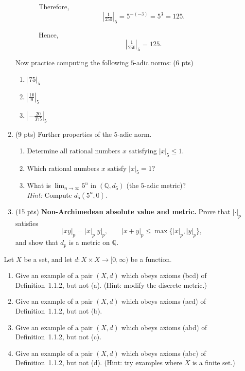 \begin{problem}
\begin{enumerate}
\begin{itemize}
\begin{enumerate}
Therefore,
\[
\left|\tfrac{1}{250}\right|_5 
= 5^{-(-3)} 
= 5^3 
= 125.
\]

Hence,
\[
\boxed{\;\;\left|\tfrac{1}{250}\right|_5 = 125.\;\;}
\]
\end{enumerate}
\end{itemize}

\medskip

Now practice computing the following $5$-adic norms:
 (6 pts) 
\begin{enumerate}
\item $|75|_5$
\item $\left|\tfrac{10}{9}\right|_5$
\item $\left|-\tfrac{20}{375}\right|_5$
\end{enumerate}

\medskip

\item[\textbf{(b)}]  (9 pts)  Further properties of the $5$-adic norm.
\begin{enumerate}
\item Determine all rational numbers $x$ satisfying $|x|_5\le 1$. 
\item Which rational numbers $x$ satisfy $|x|_5=1$?
\item What is $\lim_{n \to \infty} 5^n$ in $(\mathbb{Q}, d_5)$ (the $5$-adic metric)? \\
\emph{Hint:} Compute $d_5(5^n,0)$.
\end{enumerate}

\medskip

\item[\textbf{(c)}] (15 pts) \textbf{Non-Archimedean absolute value and metric.}  
Prove that $|\cdot|_p$ satisfies
\[
|xy|_p=|x|_p|y|_p,\qquad |x+y|_p\le \max\{|x|_p,|y|_p\},
\]
and show that $d_p$ is a metric on $\mathbb{Q}$.

\end{enumerate}
\end{problem}

\begin{problem} 
Let $X$ be a set, and let $d : X \times X \to [0,\infty)$ be a function. 

\begin{enumerate}
\item[(a)] Give an example of a pair $(X,d)$ which obeys axioms (bcd) of Definition~1.1.2, but not (a). 
\hfill (Hint: modify the discrete metric.)
\item[(b)] Give an example of a pair $(X,d)$ which obeys axioms (acd) of Definition~1.1.2, but not (b).
\item[(c)] Give an example of a pair $(X,d)$ which obeys axioms (abd) of Definition~1.1.2, but not (c).
\item[(d)] Give an example of a pair $(X,d)$ which obeys axioms (abc) of Definition~1.1.2, but not (d). 
\hfill (Hint: try examples where $X$ is a finite set.)
\end{enumerate}
\end{problem}

